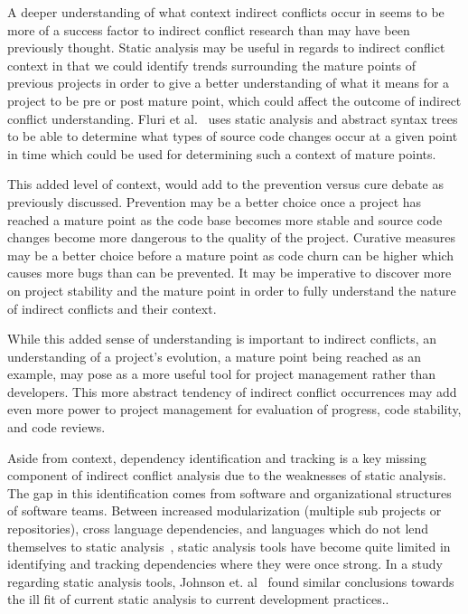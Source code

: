 \documentclass[conference]{IEEEtran}
\begin{document}
A deeper understanding of what context indirect conflicts occur in seems to be more of a success factor to indirect conflict
research than may have been previously thought. Static analysis may be useful in regards to indirect conflict context in that we
could identify trends surrounding the mature points of previous projects in order to give a better understanding of what it
means for a project to be pre or post mature point, which could affect the outcome of indirect conflict understanding.
Fluri et al.~\cite{Fluri:2007:CDT} uses static analysis and abstract syntax trees to be able to determine what types of source code
changes occur at a given point in time which could be used for determining such a context of mature points.

This added level of context,
would add to the prevention versus cure debate as previously discussed. Prevention may be a better
choice once a project has reached a mature point as the code base becomes more stable and source code changes become more dangerous
to the quality of the project. Curative measures may be a better choice before a mature point as code churn can be higher which
causes more bugs than can be prevented. It may be imperative to discover more on project stability
and the mature point in order to fully understand the nature of indirect conflicts and their context.

While this added sense of understanding is important to indirect conflicts, an understanding of a project's evolution, 
a mature point being reached as an example,
may pose as a more useful tool for project management rather than developers. This more abstract tendency of indirect
conflict occurrences may add even more power to project management for evaluation of progress, code stability, and code reviews.

Aside from context, dependency identification and tracking is a key missing component of
indirect conflict analysis due to the weaknesses of static analysis. The gap in this identification comes from software and
organizational structures of software teams. Between increased modularization (multiple sub projects or repositories),
cross language dependencies, and languages which do not lend themselves to static analysis~\cite{Jensen:2011:MHD}, static analysis tools have
become quite limited in identifying and tracking dependencies where they were once strong.
In a study regarding static analysis tools, Johnson et. al~\cite{Johnson:2013:WDS} found similar conclusions towards the
ill fit of current static analysis to current development practices..
\end{document}
